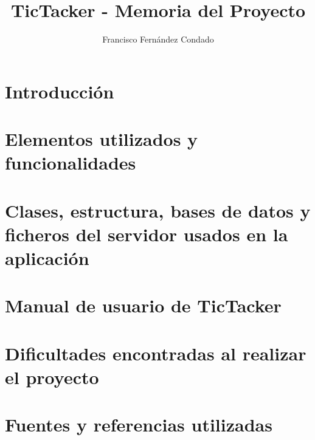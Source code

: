 \documentclass[12pt,oneside,letterpaper,spanish]{article}
\title{TicTacker - Memoria del Proyecto} %
\author{Francisco Fernández Condado}
\begin{document}


\newpage
\doublespacing
\renewcommand{\baselinestretch}{1}\normalsize
\tableofcontents
\renewcommand{\baselinestretch}{1}\normalsize
\thispagestyle{fancy} %



\newpage

\section{Introducción} \label{ch1}


\section{Elementos utilizados y funcionalidades} \label{ch2}
 

\section{Clases, estructura, bases de datos y ficheros del servidor usados en la aplicación} \label{ch3}


\section{Manual de usuario de TicTacker} \label{ch4}


\section{Dificultades encontradas al realizar el proyecto} \label{ch5}


\section{Fuentes y referencias utilizadas} \label{ch6}


\label{EndOfText}

%

% 
%


\label{endOfDoc}
\end{document}
